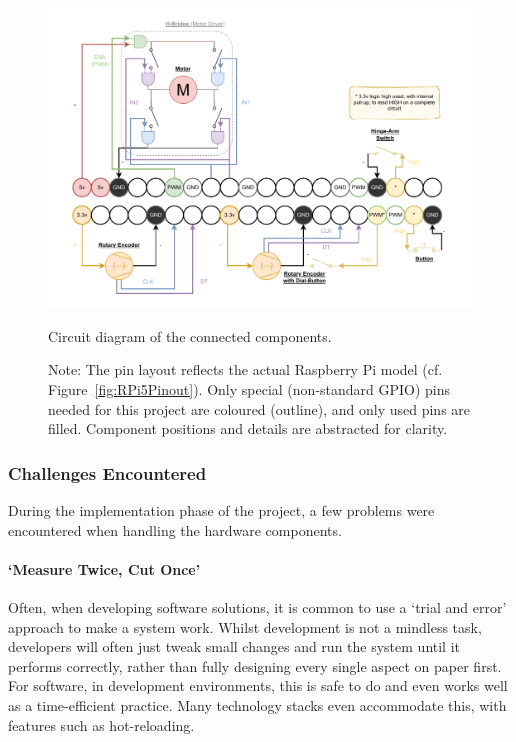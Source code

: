             \begin{figure}[h]
                \centering
                \includegraphics[width=\linewidth]{images/CircuitDiagram.pdf}
                \caption{Circuit diagram of the connected components.}
                \label{fig:circuitDiagram}
                \caption*{Note: The pin layout reflects the actual Raspberry Pi model (cf. Figure~\ref{fig:RPi5Pinout}). Only special (non-standard GPIO) pins needed for this project are coloured (outline), and only used pins are filled. Component positions and details are abstracted for clarity.}
            \end{figure}
        
            \subsubsection{Challenges Encountered}
    
                During the implementation phase of the project, a few problems were encountered when handling the hardware components.
    
                \paragraph{`Measure Twice, Cut Once'}
    
                    Often, when developing software solutions, it is common to use a `trial and error' approach to make a system work. Whilst development is not a mindless task, developers will often just tweak small changes and run the system until it performs correctly, rather than fully designing every single aspect on paper first. For software, in development environments, this is safe to do and even works well as a time-efficient practice. Many technology stacks even accommodate this, with features such as hot-reloading.
    
